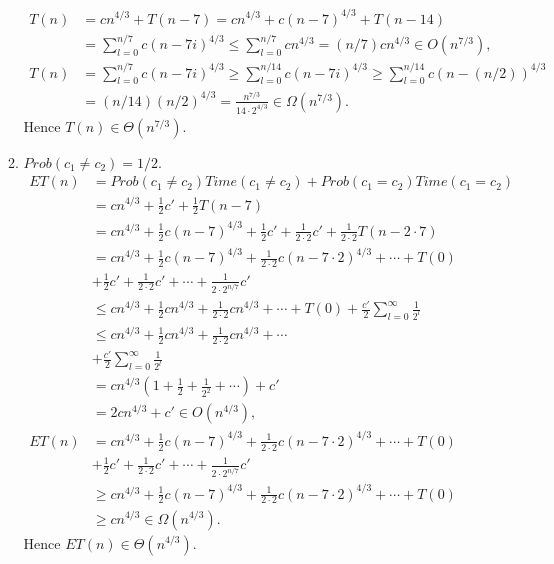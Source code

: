 \documentclass[10pt,oneside,reqno]{amsart}
\theoremstyle{plain}
\theoremstyle{definition}
\begin{document}
\begin{enumerate}[label=\arabic*.]
\begin{enumerate}
\begin{equation}
\begin{aligned}
T(n) &= cn^{4/3} + T(n - 7) =cn^{4/3} + c(n - 7)^{4/3} + T(n - 14)\\
&= \sum_{l = 0}^{n/7} c(n - 7i)^{4/3} \leq \sum_{l = 0}^{n/7} cn^{4/3} = (n/7)cn^{4/3} \in O(n^{7/3}),\\
T(n)  &= \sum_{l = 0}^{n/7} c(n - 7i)^{4/3}  \geq \sum_{l = 0}^{n/14} c(n - 7i)^{4/3}  \geq \sum_{l = 0}^{n/14} c(n - (n/2))^{4/3} \\
&= (n/14)(n/2)^{4/3} = \frac{n^{7/3}}{14 \cdot 2^{4/3}} \in \Omega(n^{7/3}). 
\end{aligned}
\end{equation}
Hence $T(n) \in \Theta(n^{7/3})$. 
\item $Prob(c_1 \neq c_2) = 1/2$. 
\begin{equation}
\begin{aligned}
ET(n) &= Prob(c_1 \neq c_2)Time(c_1 \neq c_2) + Prob(c_1 = c_2)Time(c_1 = c_2)\\
&= cn^{4/3} + \frac{1}{2}c' + \frac{1}{2}T(n - 7) \\
&= cn^{4/3} + \frac{1}{2}c(n - 7)^{4/3} +  \frac{1}{2}c' + \frac{1}{2\cdot 2}c' + \frac{1}{2\cdot 2}T(n - 2\cdot 7)\\
&= cn^{4/3} + \frac{1}{2}c(n - 7)^{4/3} +\frac{1}{2\cdot 2}c(n - 7\cdot 2)^{4/3} + \cdots + T(0)\\
&+ \frac{1}{2}c' + \frac{1}{2\cdot 2}c' + \cdots + \frac{1}{2 \cdot 2^{n/7}}c'\\
&\leq cn^{4/3} + \frac{1}{2}cn^{4/3} +\frac{1}{2\cdot 2}cn^{4/3} + \cdots + T(0) + \frac{c'}{2}\sum_{l = 0}^\infty\frac{1}{2^l}\\
& \leq cn^{4/3} + \frac{1}{2}cn^{4/3} +\frac{1}{2\cdot 2}cn^{4/3} + \cdots \\
&+ \frac{c'}{2}\sum_{l = 0}^\infty\frac{1}{2^l}\\
&= cn^{4/3} \left(1 + \frac{1}{2} + \frac{1}{2^2} + \cdots \right) + c'\\
&= 2cn^{4/3} + c' \in O(n^{4/3}),\\
ET(n) &= cn^{4/3} + \frac{1}{2}c(n - 7)^{4/3} +\frac{1}{2\cdot 2}c(n - 7\cdot 2)^{4/3} + \cdots + T(0)\\
&+ \frac{1}{2}c' + \frac{1}{2\cdot 2}c' + \cdots + \frac{1}{2 \cdot 2^{n/7}}c'\\
&\geq cn^{4/3} + \frac{1}{2}c(n - 7)^{4/3} +\frac{1}{2\cdot 2}c(n - 7\cdot 2)^{4/3} + \cdots + T(0)\\ 
&\geq cn^{4/3} \in \Omega(n^{4/3}). 
\end{aligned}
\end{equation}
Hence $ET(n) \in \Theta(n^{4/3})$. \\
\end{enumerate}


\end{enumerate}
\end{document}
